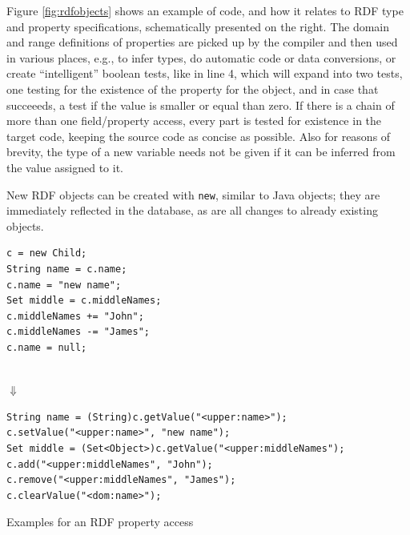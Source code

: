 Figure \ref{fig:rdfobjects} shows an example of \vonda code, and how it relates
to RDF type and property specifications, schematically presented on the right.  The
domain and range definitions of properties are picked up by the compiler and then
used in various places, e.g., to infer types, do automatic code or data
conversions, or create ``intelligent'' boolean tests, like in line 4, which
will expand into two tests, one testing for the existence of the property for
the object, and in case that succeeeds, a test if the value is smaller or equal than
zero. If there is a chain of more than one field/property access, every part is
tested for existence in the target code, keeping the source code as concise as
possible. Also for reasons of brevity, the type of a new variable needs not be
given if it can be inferred from the value assigned to it.

New RDF objects can be created with \texttt{new}, similar to Java objects; they
are immediately reflected in the database, as are all changes to already
existing objects.

\begin{table}[htbp]
  \centering
\begin{minipage}[t]{0.355\textwidth}
\begin{lstlisting}
c = new Child;
String name = c.name;
c.name = "new name";
Set middle = c.middleNames;
c.middleNames += "John";
c.middleNames -= "James";
c.name = null;
\end{lstlisting}
\end{minipage}\\{\Large$\Downarrow$}\\
\begin{minipage}[t]{0.8\textwidth}
\begin{lstlisting}
String name = (String)c.getValue("<upper:name>");
c.setValue("<upper:name>", "new name");
Set middle = (Set<Object>)c.getValue("<upper:middleNames");
c.add("<upper:middleNames", "John");
c.remove("<upper:middleNames", "James");
c.clearValue("<dom:name>");
\end{lstlisting}
\end{minipage}
  \caption{Examples for an RDF property access}
  \label{tab:property-access}
\end{table}

